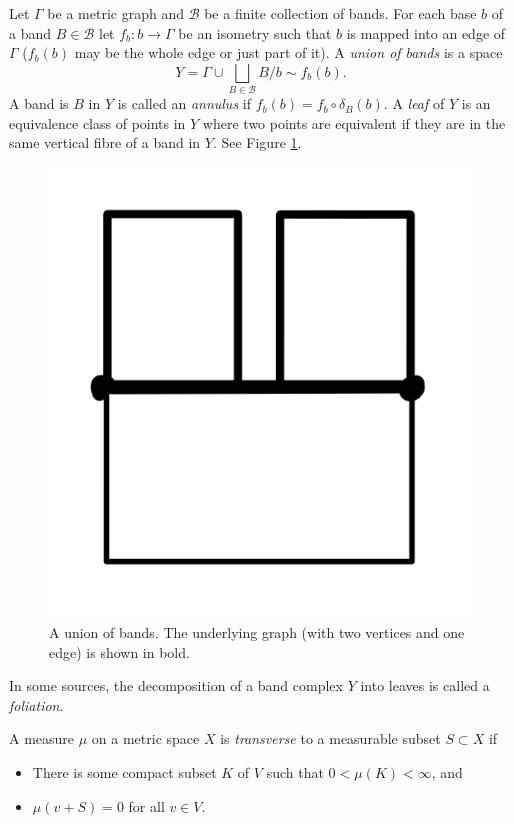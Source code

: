 \begin{definition}
    Let $\Gamma$ be a metric graph and $\mathcal{B}$ be a finite collection of bands. For each base $b$ of a band $B\in \mathcal{B}$ let $f_b:b\rightarrow\Gamma$ be an isometry such that $b$ is mapped into an edge of $\Gamma$ ($f_b(b)$ may be the whole edge or just part of it). A \emph{union of bands} is a space \[Y=\Gamma\cup\underset{B\in\mathcal{B}}{\bigsqcup}B/b \sim f_b(b).\] A band is $B$ in $Y$ is called an \emph{annulus} if $f_b(b)=f_b\circ\delta_B(b)$. A \emph{leaf} of $Y$ is an equivalence class of points in $Y$ where two points are equivalent if they are in the same vertical fibre of a band in $Y$. See Figure \ref{unionofbands}.
\end{definition}
\begin{figure}[h]
    \centering
    \includegraphics[width=0.4\linewidth]{sections/lorna/Union of Bands.png}
    \caption{A union of bands. The underlying graph (with two vertices and one edge) is shown in bold.}
    \label{unionofbands}
\end{figure}

In some sources, the decomposition of a band complex $Y$ into leaves is called a \textit{foliation}.

\begin{definition}
    A measure $\mu$ on a metric space $X$ is \emph{transverse} to a measurable subset $S\subset X$ if 
    \begin{itemize}
        \item There is some compact subset $K$ of $V$ such that $0<\mu(K)<\infty$, and
        \item $\mu(v+S)=0$ for all $v\in V$.
    \end{itemize}
\end{definition}

